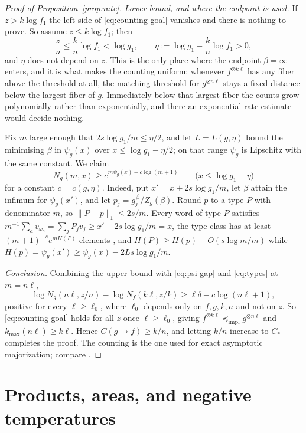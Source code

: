 \documentclass[11pt]{article}
\theoremstyle{definition}
\theoremstyle{remark}
\newcommand{\impl}{\preccurlyeq_{\mathrm{impl}}}
\begin{document}
\begin{proof}[Proof of Proposition~\ref{prop:rate}]
\emph{Lower bound, and where the endpoint is used.}  If \(z>k\log f_1\) the
left side of \eqref{eq:counting-goal} vanishes and there is nothing to prove.
So assume \(z\leq k\log f_1\); then
\[
  \frac zn\leq\frac kn\log f_1<\log g_1,
  \qquad
  \eta:=\log g_1-\frac kn\log f_1>0,
\]
and \(\eta\) does not depend on \(z\).  This is the only place where the
endpoint \(\beta=\infty\) enters, and it is what makes the counting uniform:
whenever \(f^{\otimes k\ell}\) has any fiber above the threshold at all, the
matching threshold for \(g^{\otimes n\ell}\) stays a fixed distance below the
largest fiber of \(g\).  Immediately below that largest fiber the counts grow
polynomially rather than exponentially, and there an exponential-rate estimate
would decide nothing.

Fix \(m\) large enough that \(2s\log g_1/m\leq\eta/2\), and let
\(L=L(g,\eta)\) bound the minimising \(\beta\) in \(\psi_g(x)\) over
\(x\leq\log g_1-\eta/2\); on that range \(\psi_g\) is Lipschitz with the same
constant.  We claim
\begin{equation}
  \label{eq:types}
  N_g(m,x)\geq e^{m\psi_g(x)-c\log(m+1)}
  \qquad\bigl(x\leq\log g_1-\eta\bigr)
\end{equation}
for a constant \(c=c(g,\eta)\).  Indeed, put \(x'=x+2s\log g_1/m\), let
\(\beta\) attain the infimum for \(\psi_g(x')\), and let
\(p_j=g_j^{\,\beta}/Z_g(\beta)\).  Round \(p\) to a type \(P\) with
denominator \(m\), so \(\lVert P-p\rVert_1\leq2s/m\).  Every word of type
\(P\) satisfies
\(m^{-1}\sum_av_{\omega_a}=\sum_jP_jv_j\geq x'-2s\log g_1/m=x\), the type
class has at least \((m+1)^{-s}e^{mH(P)}\) elements
\cite{cover-thomas-2006}, and
\(H(P)\geq H(p)-O(s\log m/m)\) while \(H(p)=\psi_g(x')\geq\psi_g(x)-2Ls\log
g_1/m\).

\emph{Conclusion.}  Combining the upper bound with \eqref{eq:psi-gap} and
\eqref{eq:types} at \(m=n\ell\),
\[
  \log N_g(n\ell,z/n)-\log N_f(k\ell,z/k)
  \geq\ell\delta-c\log(n\ell+1),
\]
positive for every \(\ell\geq\ell_0\), where \(\ell_0\) depends only on
\(f,g,k,n\) and not on \(z\).  So \eqref{eq:counting-goal} holds for all
\(z\) once \(\ell\geq\ell_0\), giving \(f^{\otimes k\ell}\impl g^{\otimes
n\ell}\) and \(k_{\max}(n\ell)\geq k\ell\).  Hence \(C(g\to f)\geq k/n\), and
letting \(k/n\) increase to \(C_*\) completes the proof.  The counting is the
one used for exact asymptotic majorization; compare \cite{jensen-2019}.
\end{proof}

\section{Products, areas, and negative temperatures}
\label{sec:region}
\end{document}
